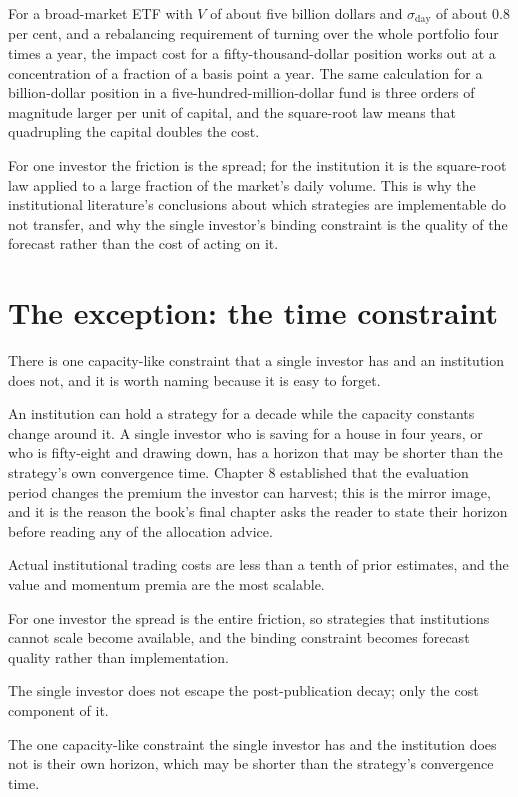 For a broad-market ETF with \(V\) of about five billion dollars and
\(\sigma_{\mathrm{day}}\) of about 0.8 per cent, and a rebalancing
requirement of turning over the whole portfolio four times a year, the
impact cost for a fifty-thousand-dollar position works out at a
concentration of a fraction of a basis point a year. The same calculation
for a billion-dollar position in a five-hundred-million-dollar fund is
three orders of magnitude larger per unit of capital, and the square-root
law means that quadrupling the capital doubles the cost.

\begin{takeaway}
For one investor the friction is the spread; for the institution it is the
square-root law applied to a large fraction of the market's daily volume.
This is why the institutional literature's conclusions about which
strategies are implementable do not transfer, and why the single investor's
binding constraint is the quality of the forecast rather than the cost of
acting on it.
\end{takeaway}

\section{The exception: the time constraint}

There is one capacity-like constraint that a single investor has and an
institution does not, and it is worth naming because it is easy to forget.

An institution can hold a strategy for a decade while the capacity
constants change around it. A single investor who is saving for a house
in four years, or who is fifty-eight and drawing down, has a horizon that
may be shorter than the strategy's own convergence time. Chapter 8
established that the evaluation period changes the premium the investor
can harvest; this is the mirror image, and it is the reason the book's
final chapter asks the reader to state their horizon before reading any of
the allocation advice.

\begin{keytakeaways}
\item Actual institutional trading costs are less than a tenth of prior
estimates, and the value and momentum premia are the most scalable.
\item For one investor the spread is the entire friction, so strategies
that institutions cannot scale become available, and the binding
constraint becomes forecast quality rather than implementation.
\item The single investor does not escape the post-publication decay; only
the cost component of it.
\item The one capacity-like constraint the single investor has and the
institution does not is their own horizon, which may be shorter than the
strategy's convergence time.
\end{keytakeaways}
